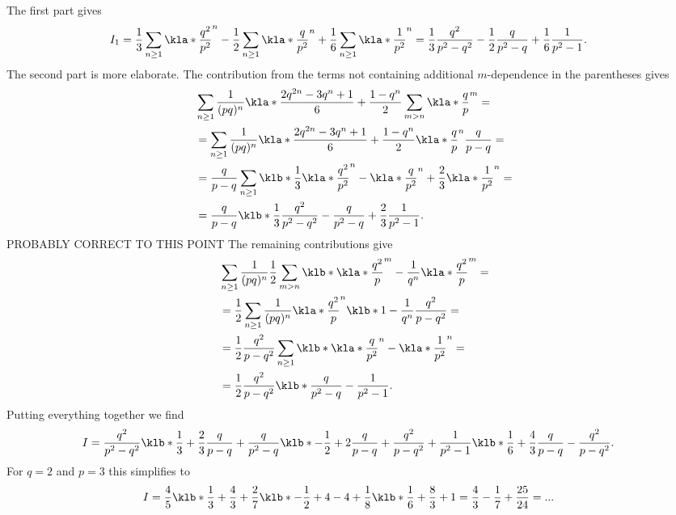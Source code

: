 \documentclass[english, parskip=full]{scrartcl}
\begin{document}
The first part gives
\begin{align}
I_1 &= \frac{1}{3} \sum_{n\ge 1} \kla*{\frac{q^2}{p^2}}^{n} - \frac{1}{2} \sum_{n\ge 1} \kla*{\frac{q}{p^2}}^n + \frac{1}{6} \sum_{n\ge 1} \kla*{\frac{1}{p^2}}^n = \frac{1}{3} \frac{q^2}{p^2 - q^2} - \frac{1}{2} \frac{q}{p^2 - q} + \frac{1}{6} \frac{1}{p^2 - 1}.
\end{align}
The second part is more elaborate.
The contribution from the terms not containing additional $m$-dependence in the parentheses gives
\begin{align}
& \sum_{n\ge 1} \frac{1}{(pq)^n} \kla*{\frac{2q^{2n} - 3q^n + 1}{6} + \frac{1-q^n}{2} } \sum_{m > n} \kla*{\frac{q}{p}}^m = \\
&= \sum_{n\ge 1} \frac{1}{(pq)^n} \kla*{\frac{2q^{2n} - 3q^n + 1}{6} + \frac{1-q^n}{2} } \kla*{\frac{q}{p}}^n \frac{q}{p-q} = \\
&= \frac{q}{p-q} \sum_{n\ge 1} \klb*{ \frac{1}{3} \kla*{\frac{q^2}{p^2}}^n - \kla*{\frac{q}{p^2}}^n + \frac{2}{3} \kla*{\frac{1}{p^2}}^n } = \\
&= \frac{q}{p-q} \klb*{\frac{1}{3} \frac{q^2}{p^2-q^2} - \frac{q}{p^2 -q} + \frac{2}{3} \frac{1}{p^2 - 1} }.
\end{align}
\color{red} PROBABLY CORRECT TO THIS POINT \color{black}
The remaining contributions give
\begin{align}
&\sum_{n\ge 1} \frac{1}{(pq)^n} \frac{1}{2} \sum_{m>n} \klb*{ \kla*{\frac{q^2}{p}}^m - \frac{1}{q^n} \kla*{\frac{q^2}{p}}^m  } = \\
&= \frac{1}{2} \sum_{n\ge 1} \frac{1}{(pq)^n} \kla*{\frac{q^2}{p}}^n  \klb*{1 - \frac{1}{q^n}} \frac{q^2}{p - q^2} = \\
&= \frac{1}{2} \frac{q^2}{p - q^2} \sum_{n\ge 1}  \klb*{ \kla*{\frac{q}{p^2}}^n - \kla*{\frac{1}{p^2}}^n } = \\
&= \frac{1}{2} \frac{q^2}{p-q^2} \klb*{ \frac{q}{p^2 - q} - \frac{1}{p^2 - 1} }.
\end{align}
Putting everything together we find
\begin{align}
I &= \frac{q^2}{p^2 - q^2} \klb*{\frac{1}{3} +\frac{2}{3} \frac{q}{p-q} } + \frac{q}{p^2 - q} \klb*{-\frac{1}{2} + 2\frac{q}{p-q} + \frac{q^2}{p - q^2} } + \frac{1}{p^2 - 1} \klb*{\frac{1}{6} + \frac{4}{3}\frac{q}{p-q} - \frac{q^2}{p - q^2} }. 
\end{align}
For $q=2$ and $p=3$ this simplifies to 
\begin{align}
I &= \frac{4}{5} \klb*{\frac{1}{3} + \frac{4}{3}} + \frac{2}{7} \klb*{-\frac{1}{2} + 4 - 4} + \frac{1}{8} \klb*{\frac{1}{6} + \frac{8}{3} + 1} = \frac{4}{3} - \frac{1}{7} + \frac{25}{24} = ...
\end{align}



\end{document}
